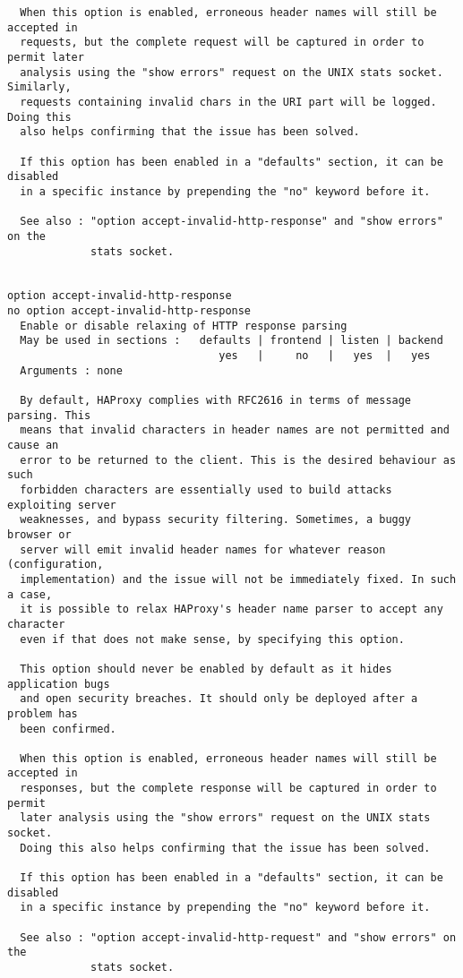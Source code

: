 \begin{verbatim}
  When this option is enabled, erroneous header names will still be accepted in
  requests, but the complete request will be captured in order to permit later
  analysis using the "show errors" request on the UNIX stats socket. Similarly,
  requests containing invalid chars in the URI part will be logged. Doing this
  also helps confirming that the issue has been solved.

  If this option has been enabled in a "defaults" section, it can be disabled
  in a specific instance by prepending the "no" keyword before it.

  See also : "option accept-invalid-http-response" and "show errors" on the
             stats socket.


option accept-invalid-http-response
no option accept-invalid-http-response
  Enable or disable relaxing of HTTP response parsing
  May be used in sections :   defaults | frontend | listen | backend
                                 yes   |     no   |   yes  |   yes
  Arguments : none

  By default, HAProxy complies with RFC2616 in terms of message parsing. This
  means that invalid characters in header names are not permitted and cause an
  error to be returned to the client. This is the desired behaviour as such
  forbidden characters are essentially used to build attacks exploiting server
  weaknesses, and bypass security filtering. Sometimes, a buggy browser or
  server will emit invalid header names for whatever reason (configuration,
  implementation) and the issue will not be immediately fixed. In such a case,
  it is possible to relax HAProxy's header name parser to accept any character
  even if that does not make sense, by specifying this option.

  This option should never be enabled by default as it hides application bugs
  and open security breaches. It should only be deployed after a problem has
  been confirmed.

  When this option is enabled, erroneous header names will still be accepted in
  responses, but the complete response will be captured in order to permit
  later analysis using the "show errors" request on the UNIX stats socket.
  Doing this also helps confirming that the issue has been solved.

  If this option has been enabled in a "defaults" section, it can be disabled
  in a specific instance by prepending the "no" keyword before it.

  See also : "option accept-invalid-http-request" and "show errors" on the
             stats socket.



\end{verbatim}
